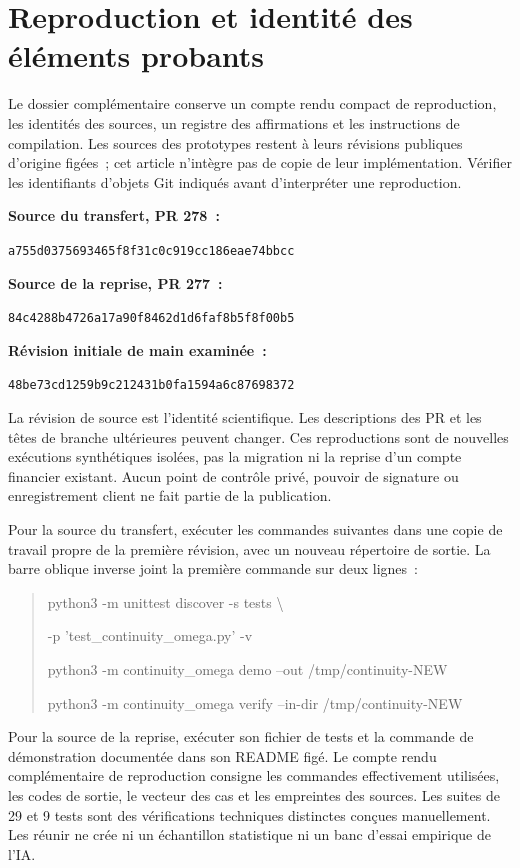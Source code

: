 \documentclass[11pt,a4paper]{article}
\newcommand{\chapterpage}{\clearpage}
\begin{document}
\chapterpage
\section{Reproduction et identité des éléments probants}\label{app:reproduction}
Le dossier complémentaire conserve un compte rendu compact de reproduction, les identités des sources, un registre des affirmations et les instructions de compilation. Les sources des prototypes restent à leurs révisions publiques d’origine figées~; cet article n’intègre pas de copie de leur implémentation. Vérifier les identifiants d’objets Git indiqués avant d’interpréter une reproduction.

\begin{scopebox}
\textbf{Source du transfert, PR 278~:}\par
\texttt{a755d0375693465f8f31c0c919cc186eae74bbcc}\par
\textbf{Source de la reprise, PR 277~:}\par
\texttt{84c4288b4726a17a90f8462d1d6faf8b5f8f00b5}\par
\textbf{Révision initiale de main examinée~:}\par
\texttt{48be73cd1259b9c212431b0fa1594a6c87698372}
\end{scopebox}
La révision de source est l’identité scientifique. Les descriptions des PR et les têtes de branche ultérieures peuvent changer. Ces reproductions sont de nouvelles exécutions synthétiques isolées, pas la migration ni la reprise d’un compte financier existant. Aucun point de contrôle privé, pouvoir de signature ou enregistrement client ne fait partie de la publication.

Pour la source du transfert, exécuter les commandes suivantes dans une copie de travail propre de la première révision, avec un nouveau répertoire de sortie. La barre oblique inverse joint la première commande sur deux lignes~:
\begin{quote}\small\ttfamily
python3 -m unittest discover -s tests \textbackslash{}\par
\hspace*{1em}-p 'test\_continuity\_omega.py' -v\par
python3 -m continuity\_omega demo --out /tmp/continuity-NEW\par
python3 -m continuity\_omega verify --in-dir /tmp/continuity-NEW
\end{quote}
Pour la source de la reprise, exécuter son fichier de tests et la commande de démonstration documentée dans son README figé. Le compte rendu complémentaire de reproduction consigne les commandes effectivement utilisées, les codes de sortie, le vecteur des cas et les empreintes des sources. Les suites de 29 et 9 tests sont des vérifications techniques distinctes conçues manuellement. Les réunir ne crée ni un échantillon statistique ni un banc d’essai empirique de l’IA.
\end{document}
